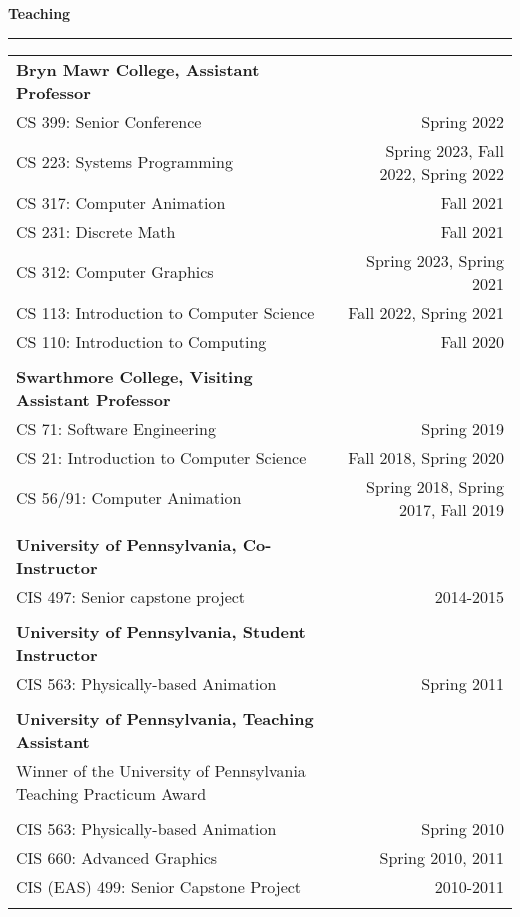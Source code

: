 \needspace{6em}
{\large {\bf Teaching}}
\vspace{0.1cm}
\hrule
\begin{tabular*}{7.1in}{@{}l@{\extracolsep\fill}r}

{\bf Bryn Mawr College, Assistant Professor} & \\
CS 399: Senior Conference & Spring 2022\\
CS 223: Systems Programming & Spring 2023, Fall 2022, Spring 2022\\
CS 317: Computer Animation & Fall 2021\\
CS 231: Discrete Math & Fall 2021\\
CS 312: Computer Graphics & Spring 2023, Spring 2021\\
CS 113: Introduction to Computer Science & Fall 2022, Spring 2021\\
CS 110: Introduction to Computing & Fall 2020\\
\phantom{yommomma} & \phantom{2002}\\

{\bf Swarthmore College, Visiting Assistant Professor} & \\
CS 71: Software Engineering & Spring 2019\\
CS 21: Introduction to Computer Science & Fall 2018, Spring 2020\\
CS 56/91: Computer Animation & Spring 2018, Spring 2017, Fall 2019\\
\phantom{yommomma} & \phantom{2002}\\

{\bf University of Pennsylvania, Co-Instructor} & \\
CIS 497: Senior capstone project & 2014-2015\\
\phantom{yommomma} & \phantom{2002}\\

{\bf University of Pennsylvania, Student Instructor} & \\
CIS 563: Physically-based Animation & Spring 2011\\
\phantom{yommomma} & \phantom{2002}\\
{\bf University of Pennsylvania, Teaching Assistant} & \\
Winner of the University of Pennsylvania Teaching Practicum Award & \\
\phantom{yommomma} & \phantom{2002}\\
CIS 563: Physically-based Animation & Spring 2010\\
CIS 660: Advanced Graphics & Spring 2010, 2011\\
CIS (EAS) 499: Senior Capstone Project  & 2010-2011\\
\phantom{yommomma} & \phantom{2002}\\
\end{tabular*}

\pagebreak

